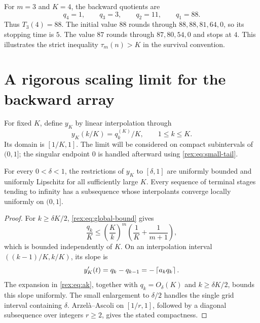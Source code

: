 \begin{example}
For $m=3$ and $K=4$, the backward quotients are
\[
 q_4=1,\qquad q_3=3,\qquad q_2=11,\qquad q_1=88.
\]
Thus $T_3(4)=88$. The initial value $88$ rounds through
$88,88,81,64,0$, so its stopping time is $5$. The value $87$ rounds
through $87,80,54,0$ and stops at $4$. This illustrates the strict
inequality $\tau_m(n)>K$ in the survival convention.
\end{example}

\section{A rigorous scaling limit for the backward array}\label{rex:sec:limit}

For fixed $K$, define $y_K$ by linear interpolation through
\begin{equation}\label{rex:eq:interpolation}
 y_K(k/K)=q_k^{(K)}/K,\qquad 1\leq k\leq K.
\end{equation}
Its domain is $[1/K,1]$. The limit will be considered on compact
subintervals of $(0,1]$; the singular endpoint $0$ is handled afterward
using \cref{rex:eq:small-tail}.

\begin{lemma}\label{rex:lem:compactness}
For every $0<\delta<1$, the restrictions of $y_K$ to $[\delta,1]$ are
uniformly bounded and uniformly Lipschitz for all sufficiently large
$K$. Every sequence of terminal stages tending to infinity has a
subsequence whose interpolants converge locally uniformly on $(0,1]$.
\end{lemma}

\begin{proof}
For $k\geq\delta K/2$, \cref{rex:eq:global-bound} gives
\[
 \frac{q_k}{K}\leq
 \left(\frac{K}{k}\right)^m\left(\frac1K+\frac1{m+1}\right),
\]
which is bounded independently of $K$. On an interpolation interval
$((k-1)/K,k/K)$, its slope is
\begin{equation}\label{rex:eq:slope}
 y_K'(t)=q_k-q_{k-1}=-\left\lceil a_kq_k\right\rceil.
\end{equation}
The expansion in \cref{rex:eq:ak}, together with $q_k=O_\delta(K)$ and
$k\geq\delta K/2$, bounds this slope uniformly. The small enlargement to
$\delta/2$ handles the single grid interval containing $\delta$.
Arzel\`a--Ascoli on $[1/r,1]$, followed by a diagonal subsequence over
integers $r\geq2$, gives the stated compactness.
\end{proof}

